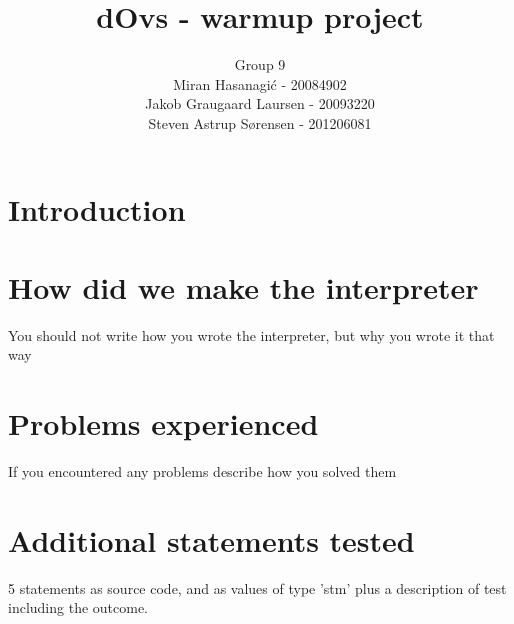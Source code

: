 \documentclass[a4paper]{article}
\title{dOvs - warmup project}
\author{
  Group 9 \\
  Miran Hasanagi\'{c} - 20084902 \\
  Jakob Graugaard Laursen - 20093220\\
  Steven Astrup Sørensen - 201206081
}
\begin{document}
\maketitle

\section{Introduction}

\section{How did we make the interpreter}
You should not write how you wrote the interpreter, but why you wrote it that way

\section{Problems experienced}
If you encountered any problems describe how you solved them

\section{Additional statements tested}
5 statements as source code, and as values of type 'stm' plus a description of test including the outcome.
\end{document}
